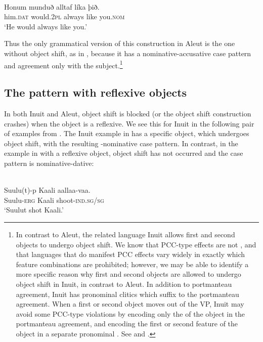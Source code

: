 \documentclass[output=paper]{LSP/langsci}
\begin{document}
\ea\label{ex:woolford:27}
\\
\gll *Honum    munduð  alltaf    líka  þið.                  \\
     \textit{ }him.\textsc{dat}  would.2\textsc{pl}  always  like   you.\textsc{nom} \\
\glt ‘He would always like you.’
\z

Thus the only grammatical version of this construction in Aleut is the one without object shift, as in , because it has a nominative-accusative case pattern and agreement only with the subject.\footnote{In contrast to Aleut, the related language Inuit allows first and second  objects to undergo object shift. We know that PCC-type effects are not , and that languages that do manifest PCC effects vary widely in exactly which feature combinations are prohibited; however, we may be able to identify a more specific reason why first and second  objects are allowed to undergo object shift in Inuit, in contrast to Aleut. In addition to portmanteau agreement, Inuit has pronominal clitics which suffix to the portmanteau agreement. When a first or second  object moves out of the VP, Inuit may avoid some PCC-type violations by encoding only the  of the object in the portmanteau agreement, and encoding the first or second  feature of the object in a separate pronominal . See \citet{fortescue1985anaphoric} and \citet{woolford2016two}.}

\subsection{The pattern with reflexive objects}

In both Inuit and Aleut, object shift is blocked (or the object shift construction crashes) when the object is a reflexive. We see this for Inuit in the following pair of examples from \citealt{bittner1994case}. The Inuit example in  has a specific object, which undergoes object shift, with the resulting -nominative case pattern. In contrast, in the example in  with a reflexive object, object shift has not occurred and the case pattern is nominative-dative:

\ea\label{ex:woolford:28}
\\
\gll Suulu(t)-p  Kaali    aallaa-vaa.                \\
     Suulu-\textsc{erg}  Kaali    shoot-\textsc{ind}.\textsc{sg}/\textsc{sg}   \\
\glt ‘Suulut shot Kaali.’
\z
\end{document}
